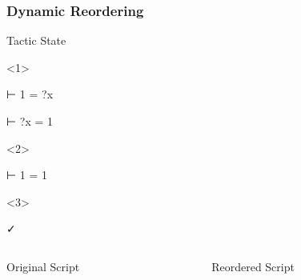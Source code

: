 \begin{frame}[fragile]
  \frametitle{Dynamic Reordering}

  \begin{block}{Tactic State}
    \begin{onlyenv}<1>
      \begin{leancode}
        ⊢ 1 = ?x

        ⊢ ?x = 1
      \end{leancode}
    \end{onlyenv}
    \begin{onlyenv}<2>
      \begin{leancode}
        ⊢ 1 = 1


      \end{leancode}
    \end{onlyenv}
    \begin{onlyenv}<3>
      \begin{leancode}
        ✓


      \end{leancode}
    \end{onlyenv}
  \end{block}

  \begin{columns}[onlytextwidth,t]
    \begin{column}{.6\textwidth}
      \begin{block}{Original Script}
        \begin{tcolorbox}
          \small
           \\
           \\
           \\
           \\
           \\
        \end{tcolorbox}
      \end{block}
    \end{column}

    \begin{column}{.38\textwidth}
      \begin{block}{Reordered Script}
        \begin{tcolorbox}
          \small
           \\
           \\
           \\
           \\
          \visible<2->{\lean{rfl}} \\
        \end{tcolorbox}
      \end{block}
    \end{column}
  \end{columns}
\end{frame}

